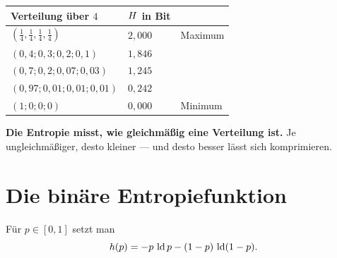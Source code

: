 \begin{merksatz}
\begin{center}
{\small
\renewcommand{\arraystretch}{1.48}
\begin{tabular}{@{}P{3.4cm}P{1.8cm}P{2.2cm}@{}}
\toprule
\textbf{Verteilung über $4$} & $H$ in Bit & \\
\midrule
$(\tfrac14,\tfrac14,\tfrac14,\tfrac14)$ & $2{,}000$ & \textcolor{akzent}{Maximum}\\
$(0{,}4;0{,}3;0{,}2;0{,}1)$ & $1{,}846$ & \\
$(0{,}7;0{,}2;0{,}07;0{,}03)$ & $1{,}245$ & \\
$(0{,}97;0{,}01;0{,}01;0{,}01)$ & $0{,}242$ & \\
$(1;0;0;0)$ & $0{,}000$ & \textcolor{gruen}{Minimum}\\
\bottomrule
\end{tabular}}
\end{center}

\begin{center}
\begin{minipage}{0.9\textwidth}
\textbf{Die Entropie misst, wie gleichmäßig eine Verteilung ist.} Je ungleichmäßiger, desto kleiner --- und desto besser lässt sich komprimieren.
\end{minipage}
\end{center}

\begin{center}
\begin{minipage}{0.88\textwidth}
\end{minipage}
\end{center}
\end{merksatz}

\section{Die binäre Entropiefunktion}

\begin{definition}
Für $p\in[0,1]$ setzt man
\[ h(p) = -p\,\operatorname{ld} p - (1-p)\,\operatorname{ld}(1-p) . \]
\end{definition}

